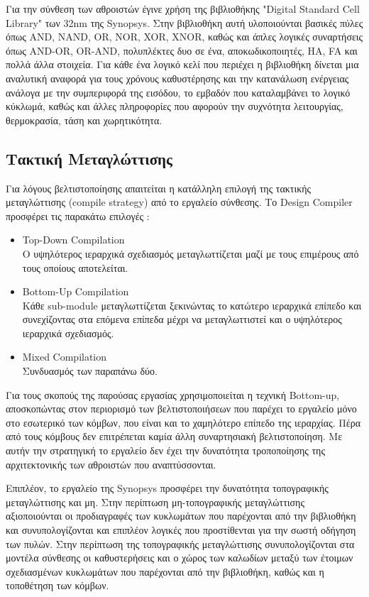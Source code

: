Για την σύνθεση των αθροιστών έγινε χρήση της βιβλιοθήκης "Digital Standard Cell Library" 
των 32nm της Synopsys. Στην βιβλιοθήκη αυτή υλοποιούνται βασικές πύλες όπως AND, NAND, 
OR, NOR, XOR, XNOR, καθώς και άπλες λογικές συναρτήσεις όπως AND-OR, OR-AND, πολυπλέκτες 
δυο σε ένα, αποκωδικοποιητές, HA, FA και πολλά άλλα στοιχεία.
Για κάθε ένα λογικό κελί που περιέχει η βιβλιοθήκη δίνεται μια αναλυτική αναφορά
για τους χρόνους καθυστέρησης και την κατανάλωση ενέργειας ανάλογα με την συμπεριφορά της εισόδου,
το εμβαδόν που καταλαμβάνει το λογικό κύκλωμά, καθώς και άλλες πληροφορίες που αφορούν την 
συχνότητα λειτουργίας, θερμοκρασία, τάση και χωρητικότητα.









\subsection{Τακτική Μεταγλώττισης}

Για λόγους βελτιστοποίησης απαιτείται η κατάλληλη επιλογή της τακτικής μεταγλώττισης (compile strategy) από το εργαλείο σύνθεσης. Το Design Compiler προσφέρει τις παρακάτω επιλογές :
\begin{itemize}
  \item Top-Down Compilation\\
  Ο υψηλότερος ιεραρχικά σχεδιασμός μεταγλωττίζεται μαζί με τους επιμέρους από τους οποίους αποτελείται.
  \item Bottom-Up Compilation\\
  Κάθε sub-module μεταγλωττίζεται ξεκινώντας το κατώτερο ιεραρχικά επίπεδο και συνεχίζοντας στα επόμενα επίπεδα μέχρι να μεταγλωττιστεί και ο υψηλότερος ιεραρχικά σχεδιασμός.
  \item Mixed Compilation\\
  Συνδυασμός των παραπάνω δύο.
\end{itemize}
Για τους σκοπούς της παρούσας εργασίας χρησιμοποιείται η τεχνική Bottom-up, αποσκοπώντας στον περιορισμό των βελτιστοποιήσεων που παρέχει το εργαλείο μόνο στο εσωτερικό των κόμβων, που είναι και το χαμηλότερο επίπεδο της ιεραρχίας. Πέρα από τους κόμβους δεν επιτρέπεται καμία άλλη συναρτησιακή βελτιστοποίηση. Με αυτήν την στρατηγική το εργαλείο δεν έχει την δυνατότητα τροποποίησης της αρχιτεκτονικής των αθροιστών που αναπτύσσονται.

Επιπλέον, το εργαλείο της Synopsys προσφέρει την δυνατότητα τοπογραφικής μεταγλώττισης και μη. Στην περίπτωση μη-τοπογραφικής μεταγλώττισης αξιοποιούνται οι προδιαγραφές των κυκλωμάτων που παρέχονται από την βιβλιοθήκη και συνυπολογίζονται και επιπλέον λογικές που προστίθενται για την σωστή οδήγηση των πυλών. Στην περίπτωση της τοπογραφικής μεταγλώττισης συνυπολογίζονται στα μοντέλα σύνθεσης οι καθυστερήσεις και ο χώρος των καλωδίων μεταξύ των έτοιμων σχεδιασμένων κυκλωμάτων που παρέχονται από την βιβλιοθήκη, καθώς και η τοποθέτηση των κόμβων.











